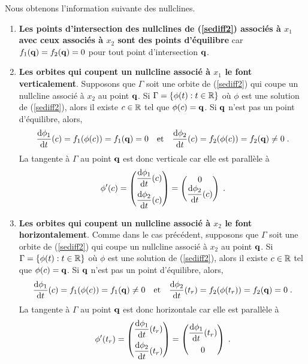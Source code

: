 {Nous obtenons l'information suivante des nullclines.
\begin{enumerate}
\item {\bfseries Les points d'intersection des nullclines de
(\ref{sediff2}) associés à $x_1$ avec ceux associés à $x_2$ sont des
points d'équilibre} car $f_1(\mathbf{q}) = f_2(\mathbf{q}) = 0$ pour tout
point d'intersection $\mathbf{q}$.
\item {\bfseries Les orbites qui coupent un nullcline associé à
$x_1$ le font verticalement}.  Supposons que $\Gamma$ soit une orbite
de (\ref{sediff2}) qui coupe un nullcline associé à $x_2$ au point
$\mathbf{q}$.  Si $\Gamma = \{ \phi(t) : t \in \mathbb{R}\}$ où $\phi$ est une
solution de (\ref{sediff2}), alors il existe $c\in \mathbb{R}$ tel que
$\phi(c) = \mathbf{q}$.  Si $\mathbf{q}$ n'est pas un point d'équilibre,
alors,
\[
\frac{\mathrm{d}\phi_1}{\mathrm{d}t}(c) = f_1(\phi(c)) = f_1(\mathbf{q}) = 0
\quad \text{et} \quad
\frac{\mathrm{d}\phi_2}{\mathrm{d}t}(c) = f_2(\phi(c)) = f_2(\mathbf{q}) \neq 0 \; .
\]
La tangente à $\Gamma$ au point $\mathbf{q}$ est donc verticale car elle
est parallèle à
\[
\phi'(c) =
\begin{pmatrix}
\displaystyle \frac{\mathrm{d}\phi_1}{\mathrm{d}t}(c) \\[2ex] \displaystyle \frac{\mathrm{d}\phi_2}{\mathrm{d}t}(c)
\end{pmatrix}
=
\begin{pmatrix}
\displaystyle 0\\ \displaystyle \frac{\mathrm{d}\phi_2}{\mathrm{d}t}(c)
\end{pmatrix} \; .
\]
\item {\bfseries Les orbites qui coupent un nullcline associé à
$x_2$ le font horizontalement}.  Comme dans le cas précédent,
supposons que $\Gamma$ soit une orbite
de (\ref{sediff2}) qui coupe un nullcline associé à $x_2$ au point
$\mathbf{q}$.  Si $\Gamma = \{ \phi(t) : t \in \mathbb{R}\}$ où $\phi$ est une
solution de (\ref{sediff2}), alors il existe $c\in \mathbb{R}$ tel que
$\phi(c) = \mathbf{q}$.  Si $\mathbf{q}$ n'est pas un point d'équilibre,
alors,  
\[
\frac{\mathrm{d}\phi_1}{\mathrm{d}t}(c) = f_1(\phi(c)) = f_1(\mathbf{q}) \neq 0
\quad \text{et} \quad
\frac{\mathrm{d}\phi_2}{\mathrm{d}t}(t_r) = f_2(\phi(t_r)) = f_2(\mathbf{q}) = 0 \; .
\]
La tangente à $\Gamma$ au point $\mathbf{q}$ est donc horizontale car
elle est parallèle à
\[
\phi'(t_r) =
\begin{pmatrix}
\displaystyle \frac{\mathrm{d}\phi_1}{\mathrm{d}t}(t_r) \\[2ex] \displaystyle \frac{\mathrm{d}\phi_2}{\mathrm{d}t}(t_r)
\end{pmatrix}
=
\begin{pmatrix} \displaystyle \frac{\mathrm{d}\phi_1}{\mathrm{d}t}(t_r) \\[2ex] 0\end{pmatrix} \; .
\]
\end{enumerate}

}
